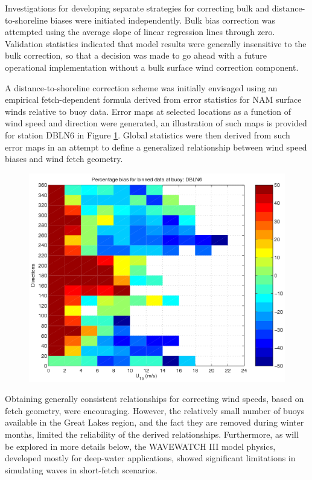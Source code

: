 Investigations for developing separate strategies for correcting bulk and
distance-to-shoreline biases were initiated independently. Bulk bias correction
was attempted using the average slope of linear regression lines through zero.
Validation statistics indicated that model results were generally insensitive to
the bulk correction, so that a decision was made to go ahead with a future
operational implementation without a bulk surface wind correction component.

A distance-to-shoreline correction scheme was initially envisaged using an
empirical fetch-dependent formula derived from error statistics for NAM surface
winds relative to buoy data. Error maps at selected locations as a function of
wind speed and direction were generated, an illustration of such maps is
provided for station DBLN6 in Figure \ref{fig:nambins}. Global statistics were
then derived from such error maps in an attempt to define a generalized
relationship between wind speed biases and wind fetch geometry. 

\begin{figure}[h!]
 \centering
 \includegraphics{./figures/fig_DBLN6_bins.png}
 \label{fig:nambins}
\end{figure}

Obtaining generally consistent relationships for correcting wind speeds, based
on fetch geometry, were encouraging. However, the relatively small number of
buoys available in the Great Lakes region, and the fact they are removed during
winter months, limited the reliability of the derived relationships.
Furthermore, as will be explored in more details below, the WAVEWATCH III model
physics, developed mostly for deep-water applications, showed significant
limitations in simulating waves in short-fetch scenarios. 

